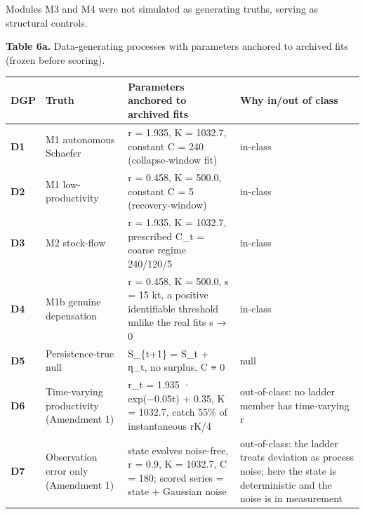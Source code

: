 \documentclass[11pt]{article}
\begin{document}
Modules M3 and M4 were not simulated as generating truths, serving as
structural controls.

\textbf{Table 6a.} Data-generating processes with parameters anchored to
archived fits (frozen before scoring).

{\def\LTcaptype{none} %
\begin{longtable}[]{@{}
  >{\raggedright\arraybackslash}p{}
  >{\raggedright\arraybackslash}p{}
  >{\raggedright\arraybackslash}p{}
  >{\raggedright\arraybackslash}p{}@{}}
\toprule\noalign{}
\begin{minipage}[b]{\linewidth}\raggedright
DGP
\end{minipage} & \begin{minipage}[b]{\linewidth}\raggedright
Truth
\end{minipage} & \begin{minipage}[b]{\linewidth}\raggedright
Parameters anchored to archived fits
\end{minipage} & \begin{minipage}[b]{\linewidth}\raggedright
Why in/out of class
\end{minipage} \\
\midrule\noalign{}
\endhead
\bottomrule\noalign{}
\endlastfoot
\textbf{D1} & M1 autonomous Schaefer & r = 1.935, K = 1032.7, constant C
= 240 (collapse-window fit) & in-class \\
\textbf{D2} & M1 low-productivity & r = 0.458, K = 500.0, constant C = 5
(recovery-window) & in-class \\
\textbf{D3} & M2 stock-flow & r = 1.935, K = 1032.7, prescribed C\_t =
coarse regime 240/120/5 & in-class \\
\textbf{D4} & M1b genuine depensation & r = 0.458, K = 500.0, s = 15 kt,
a positive identifiable threshold unlike the real fits s → 0 &
in-class \\
\textbf{D5} & Persistence-true null & S\_\{t+1\} = S\_t + η\_t, no
surplus, C ≡ 0 & null \\
\textbf{D6} & Time-varying productivity (Amendment 1) & r\_t = 1.935 ·
exp(−0.05t) + 0.35, K = 1032.7, catch 55\% of instantaneous rK/4 &
out-of-class: no ladder member has time-varying r \\
\textbf{D7} & Observation error only (Amendment 1) & state evolves
noise-free, r = 0.9, K = 1032.7, C = 180; scored series = state +
Gaussian noise & out-of-class: the ladder treats deviation as process
noise; here the state is deterministic and the noise is in
measurement \\
\end{longtable}
}
\end{document}
